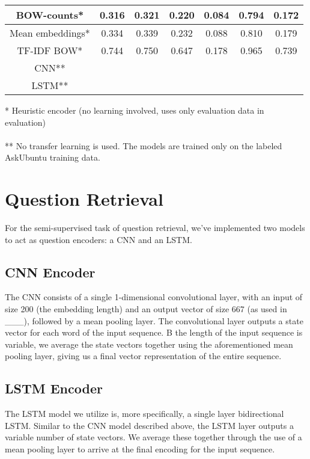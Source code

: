 \documentclass[12pt]{article}
\begin{document}
\begin{center}
\begin{tabular}{|c||c|c|c|c||c|c|}
			\cellcolor{red!15}BOW-counts* & 0.316 & 0.321 & 0.220 & 0.084 & 0.794 & 0.172 \\ \hline
			\cellcolor{red!15}Mean embeddings* & 0.334 & 0.339 & 0.232 & 0.088 & 0.810 & 0.179 \\ \hline
			\cellcolor{red!15}TF-IDF BOW* & 0.744 & 0.750 & 0.647 & 0.178 & 0.965 & 0.739 \\ \hline\hline
			\cellcolor{green!15}CNN** &  &  &  &  &  &  \\ \hline
			\cellcolor{green!15}LSTM** &  &  &  &  &  &  \\ \hline
		\end{tabular}
	\end{center}
	* Heuristic encoder (no learning involved, uses only evaluation data in evaluation) \\\\
	** No transfer learning is used. The models are trained only on the labeled AskUbuntu training data.

\section{Question Retrieval}
For the semi-supervised task of question retrieval, we've implemented two models to act as question encoders: a CNN and an LSTM.

\subsection{CNN Encoder}
The CNN consists of a single 1-dimensional convolutional layer, with an input of size 200 (the embedding length) and an output vector of size 667 (as used in \_\_\_), followed by a mean pooling layer. The convolutional layer outputs a state vector for each word of the input sequence. B the length of the input sequence is variable, we average the state vectors together using the aforementioned mean pooling layer, giving us a final vector representation of the entire sequence.

\subsection{LSTM Encoder}
The LSTM model we utilize is, more specifically, a single layer bidirectional LSTM. Similar to the CNN model described above, the LSTM layer outputs a variable number of state vectors. We average these together through the use of a mean pooling layer to arrive at the final encoding for the input sequence.
\end{document}
